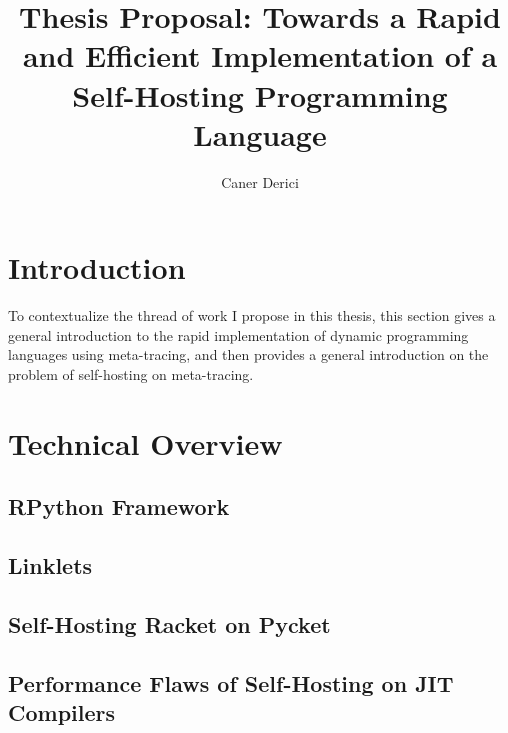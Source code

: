 \documentclass[9pt]{extarticle}
\title{Thesis Proposal: Towards a Rapid and Efficient Implementation
  of a Self-Hosting Programming Language}
\author{Caner Derici}
\begin{document}


\maketitle

\begin{abstract}
\end{abstract}

\section{Introduction}

To contextualize the thread of work I propose in this thesis, this
section gives a general introduction to the rapid implementation of
dynamic programming languages using meta-tracing, and then provides a
general introduction on the problem of self-hosting on meta-tracing.





\section{Technical Overview}

%

%

%

\subsection{RPython Framework}

\subsection{Linklets}

\subsection{Self-Hosting Racket on Pycket}

\subsection{Performance Flaws of Self-Hosting on JIT Compilers}
\end{document}
